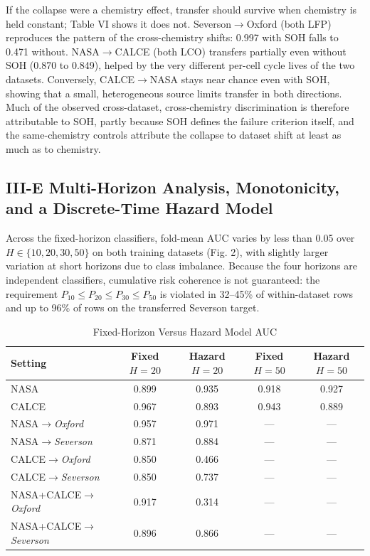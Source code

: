 \documentclass[conference]{IEEEtran}
\begin{document}
If the collapse were a chemistry effect, transfer should survive when
chemistry is held constant; Table VI shows it does
not. Severson$\to$Oxford (both LFP) reproduces the pattern of the
cross-chemistry shifts: 0.997 with SOH falls to 0.471 without.
NASA$\to$CALCE (both LCO) transfers partially even without SOH
(0.870 to 0.849), helped by the very different per-cell cycle lives of
the two datasets. Conversely, CALCE$\to$NASA stays near chance even
with SOH, showing that a small, heterogeneous source limits transfer
in both directions. Much of the observed
cross-dataset, cross-chemistry discrimination is therefore attributable
to SOH, partly because SOH defines the failure criterion itself, and
the same-chemistry controls attribute the collapse to dataset shift at
least as much as to chemistry.

\subsection{III-E Multi-Horizon Analysis, Monotonicity, and a Discrete-Time Hazard Model}
Across the fixed-horizon classifiers, fold-mean AUC varies by less than
0.05 over $H \in \{10,20,30,50\}$ on both training datasets
(Fig. 2), with slightly larger variation at short
horizons due to class imbalance. Because the four horizons are
independent classifiers, cumulative risk coherence is not guaranteed:
the requirement $P_{10} \le P_{20} \le P_{30} \le P_{50}$
is violated in 32--45\% of within-dataset rows and up to 96\% of rows
on the transferred Severson target.

\begin{table}[!t]
\caption{Fixed-Horizon Versus Hazard Model AUC}
\label{tab:hazard}
\centering
\begin{tabular}{|l|c|c|c|c|}
\hline
\textbf{Setting} & \textbf{Fixed $H{=}20$} & \textbf{Hazard $H{=}20$} & \textbf{Fixed $H{=}50$} & \textbf{Hazard $H{=}50$}\\
\hline
NASA & 0.899 & 0.935 & 0.918 & 0.927 \\ \hline
CALCE & 0.967 & 0.893 & 0.943 & 0.889 \\ \hline
NASA$\to$\textit{Oxford} & 0.957 & 0.971 & --- & --- \\ \hline
NASA$\to$\textit{Severson} & 0.871 & 0.884 & --- & --- \\ \hline
CALCE$\to$\textit{Oxford} & 0.850 & 0.466 & --- & --- \\ \hline
CALCE$\to$\textit{Severson} & 0.850 & 0.737 & --- & --- \\ \hline
NASA+CALCE$\to$\textit{Oxford} & 0.917 & 0.314 & --- & --- \\ \hline
NASA+CALCE$\to$\textit{Severson} & 0.896 & 0.866 & --- & --- \\ \hline
\end{tabular}
\end{table}
\end{document}

